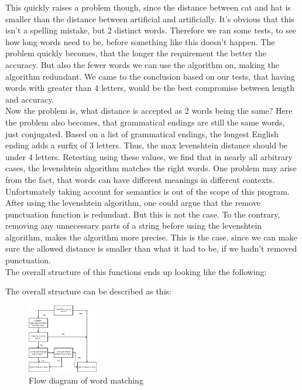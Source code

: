 This quickly raises a problem though, since the distance between cat and hat is smaller than the distance
between artificial and artificially. 
It's obvious that this isn't a spelling mistake, but 2 distinct words. Therefore we ran
some tests, to see how long words need to be, before something like this doesn't happen. 
The problem quickly becomes, that the longer the requirement the better the accuracy. 
But also the fewer words we can use the algorithm on, making the algorithm redundant.
We came to the conclusion based on our tests, that having words with greater than 4 letters, would be
the best compromise between length and accuracy.
\\
Now the problem is, what distance is accepted as 2 words being the same?
Here the problem also becomes, that grammatical endings are still the same words, just conjugated.
Based on a list of grammatical endings, the longest English ending adds a surfix of 3 letters\cite{grammar_endings}. Thus,
the max levenshtein distance should be under 4 letters.
Retesting using these values, we find that in nearly all arbitrary cases, the levenshtein algorithm matches the right words.
One problem may arise from the fact, that words can have different meanings in different contexts. Unfortunately taking account for semantics is out of the scope of this program.
\\
After using the levenshtein algorithm, one could argue that the remove punctuation function is redundant. But this is not the case. To the contrary, removing any
unnecessary parts of a string before using the levenshtein algorithm, makes the algorithm more precise. This is the case, since we can make sure the allowed distance
is smaller than what it had to be, if we hadn't removed punctuation.
\\
The overall structure of this functions ends up looking like the following:

The overall structure can be described as this:
\begin{figure}[ht]
  \centering
  \includegraphics[height=3cm]{figures/is_match}
  \caption{Flow diagram of word matching}\label{fig:ie}
\end{figure}

